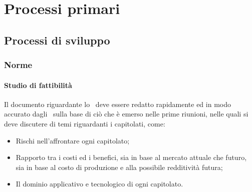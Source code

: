 \documentclass[../NormeProgetto.tex]{subfiles}
\begin{document}
\section{Processi primari}
	\subsection{Processi di sviluppo}
		\subsubsection{Norme}
			\paragraph{Studio di fattibilità}
			Il documento riguardante lo \studiodifattibilita\ deve essere redatto rapidamente ed in modo accurato dagli \analisti\ sulla base di ciò che è emerso nelle prime riunioni, nelle quali si deve discutere di temi riguardanti i capitolati, come:
			\begin{itemize}
				\item Rischi nell'affrontare ogni capitolato;
				\item Rapporto tra i costi ed i benefici, sia in base al mercato attuale che futuro, sia in base al costo di produzione e alla possibile redditività futura;
				\item Il dominio applicativo e tecnologico di ogni capitolato.
			\end{itemize}
\end{document}

